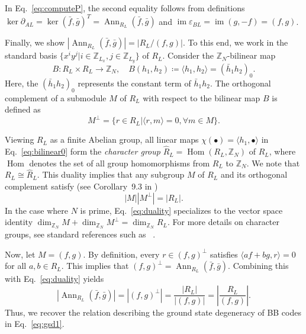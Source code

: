 \documentclass[aps,prb,english,superscriptaddress,twocolumn,tightenlines,showpacs,longbibliography,floatfix,amsfonts]{revtex4-2}
\newcommand{\im}{\operatorname{im}}
\newcommand{\eps}{\varepsilon}
\renewcommand{\hom}{\operatorname{Hom}}
\begin{document}
In Eq.~\eqref{eq:computeP}, the second equality follows from definitions $\ker\partial_{AL}=\ker(\bar{f},\bar{g})^T=\operatorname{Ann}_{R_L}(\bar{f},\bar{g})$ and $\im\eps_{BL}=\im(g,-f)=(f,g)$.
  
Finally, we show $\left|\operatorname{Ann}_{R_L}(\bar{f},\bar{g})\right|=\left| R_L/(f,g)\right|$. To this end, we work in the standard basis $\{x^iy^j|i\in\mathbb{Z}_{L_x},j\in\mathbb{Z}_{L_y}\}$ of $R_L$. Consider the $\mathbb{Z}_N$-bilinear map
\begin{equation}
    B: R_L\times R_L\to \mathbb{Z}_N,\quad B(h_1,h_2)\coloneqq\langle h_1,h_2\rangle=(\bar{h}_1h_2)_0.\label{eq:bilinear0}
\end{equation}
Here, the $(\bar{h}_1h_2)_0$ represents the constant term of $\bar{h}_1h_2$. The orthogonal complement of a submodule $M$ of $R_L$ with respect to the bilinear map $B$ is defined as
\begin{equation}
    M^{\perp}=\{r\in R_L|\langle r,m\rangle=0,\forall m\in M\}.
\end{equation}
  
Viewing $R_L$ as a finite Abelian group, all linear maps $\chi(\bullet)=\langle h_1,\bullet\rangle$ in Eq.~\eqref{eq:bilinear0} form the \emph{character group} $\hat{R}_L=\hom(R_L,\mathbb{Z}_N)$ of $R_L$, where $\hom$ denotes the set of all group homomorphisms from $R_L$ to $\mathbb{Z}_N$. We note that $R_L\cong \hat{R}_L$. This duality implies that any subgroup $M$ of $R_L$ and its orthogonal complement satisfy (see Corollary~9.3 in \cite{Lang2002})
\begin{equation}
    |M||M^{\perp}|=|R_L|.\label{eq:duality}
\end{equation}
In the case where $N$ is prime, Eq.~\eqref{eq:duality} specializes to the vector space identity $\dim_{\mathbb{Z}_N}M+\dim_{\mathbb{Z}_N}M^{\perp}=\dim_{\mathbb{Z}_N}R_L$. For more details on character groups, see standard references such as ~\cite{Lang2002, Apostol1976, Terras1999, Wood1999}. 
  
Now, let $M=(f,g)$. By definition, every $r\in (f,g)^{\perp}$ satisfies $\langle af+bg, r\rangle=0$ for all $a,b\in R_L$. This implies that $(f,g)^{\perp}=\operatorname{Ann}_{R_L}(\bar{f},\bar{g})$.
Combining this with Eq.~\eqref{eq:duality} yields
\begin{equation}
    \left|\operatorname{Ann}_{R_L}(\bar{f},\bar{g})\right|=\left|(f,g)^{\perp}\right|=\frac{|R_L|}{|(f,g)|}=\left|\frac{R_L}{(f,g)}\right|.
\end{equation}
Thus, we recover the relation describing the ground state degeneracy of BB codes in Eq.~\eqref{eq:gsd1}.
\end{document}
